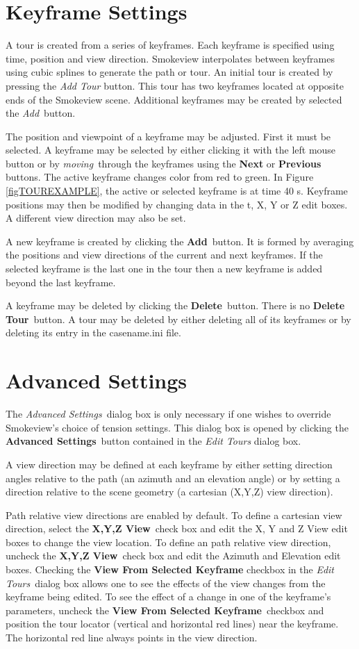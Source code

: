 \documentclass[11pt,twoside]{book}
\begin{document}
\section{Keyframe Settings}
A tour is created from a series of keyframes.  Each keyframe is specified using time, position and view direction.  Smokeview interpolates between keyframes using cubic splines to generate the path or tour.  An initial tour is created by pressing the {\em Add Tour} button.  This tour has two keyframes located at opposite ends of the Smokeview scene.  Additional keyframes may be created by selected the {\em Add}\ button.

The position and viewpoint of a keyframe may be adjusted.  First it must be selected.  A keyframe may be selected by either clicking it with
the left mouse button or by {\em moving}\ through the keyframes using the {\bf Next} or {\bf Previous} buttons.  The active keyframe changes color from red to green.  In Figure \ref{figTOUREXAMPLE}, the active or selected keyframe is at time 40 s.
Keyframe positions may then be modified by changing data in the t,
X, Y or Z edit boxes. A different view direction may also be set.

A new keyframe is created by clicking the {\bf Add}\ button. It is
formed by averaging the positions and view directions of the
current and next keyframes. If the selected keyframe is the last
one in the tour then a new keyframe  is added beyond the last
keyframe.

A keyframe may be deleted by clicking the {\bf Delete}\ button.
There is no {\bf Delete Tour}\ button. A tour may be deleted by
either deleting all of its keyframes or by deleting its entry in
the casename.ini file.

\section{Advanced Settings}
The {\em Advanced Settings}\ dialog box is only necessary if one
wishes to override Smokeview's choice of tension settings.  This dialog box is
opened by clicking the {\bf Advanced Settings}\ button contained
in the {\em Edit Tours} dialog box.

A view direction may be defined at each keyframe by either setting
direction angles relative to the path (an azimuth and an elevation
angle) or by setting a direction relative to the scene geometry (a
cartesian (X,Y,Z) view direction).

Path relative view directions are enabled by default.  To define a
cartesian view direction, select the {\bf X,Y,Z View}\ check box
and edit the X, Y and Z View edit boxes to change the view
location. To define an path relative view direction, uncheck the
{\bf X,Y,Z View}\ check box and edit the Azimuth and Elevation
edit boxes. Checking the {\bf View From Selected Keyframe}
checkbox in the {\em Edit Tours}\ dialog box allows one to see the effects of the  view changes
from the keyframe being edited. To see the effect of a change in
one of the keyframe's parameters, uncheck the {\bf View From
Selected Keyframe}\ checkbox and position the tour locator
(vertical and horizontal red lines) near the keyframe.  The
horizontal red line always points in the view direction.
\end{document}
